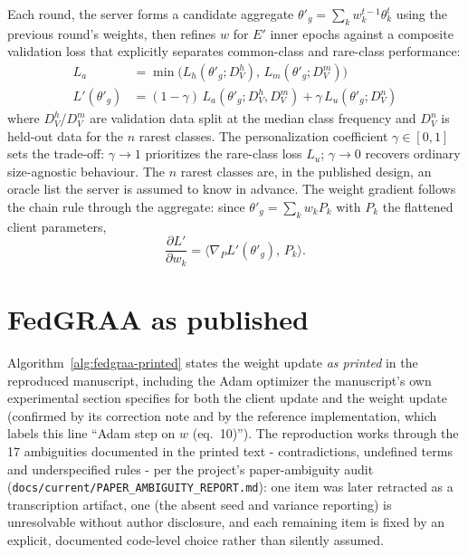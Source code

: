 \documentclass[11pt,a4paper]{report}
\newcommand{\Lprime}{L'}
\begin{document}
Each round, the server forms a candidate aggregate
$\theta'_g=\sum_k w_k^{t-1}\theta_k^t$ using the previous round's weights,
then refines $w$ for $E'$ inner epochs against a composite validation loss
that explicitly separates common-class and rare-class performance:
\begin{align}
L_a &= \min\bigl(L_h(\theta'_g; D_V^h),\, L_m(\theta'_g; D_V^m)\bigr)
\label{eq:la}\\
\Lprime(\theta'_g) &= (1-\gamma)\, L_a(\theta'_g; D_V^h, D_V^m)
                   + \gamma\, L_u(\theta'_g; D_V^n)
\label{eq:lprime}
\end{align}
where $D_V^h$/$D_V^m$ are validation data split at the median class frequency
and $D_V^n$ is held-out data for the $n$ rarest classes. The personalization
coefficient $\gamma\in[0,1]$ sets the trade-off: $\gamma\to1$ prioritizes the
rare-class loss $L_u$; $\gamma\to0$ recovers ordinary size-agnostic
behaviour. The $n$ rarest classes are, in the published design, an oracle
list the server is assumed to know in advance. The weight gradient follows
the chain rule through the aggregate: since
$\theta'_g=\sum_k w_k P_k$ with $P_k$ the flattened client parameters,
\begin{equation}
\frac{\partial \Lprime}{\partial w_k}
= \bigl\langle \nabla_P \Lprime(\theta'_g),\, P_k \bigr\rangle .
\label{eq:wgrad}
\end{equation}

\section{FedGRAA as published}
\label{sec:fedgraa-printed}

Algorithm~\ref{alg:fedgraa-printed} states the weight update \emph{as
printed} in the reproduced manuscript, including the Adam optimizer the
manuscript's own experimental section specifies for both the client update
and the weight update (confirmed by its correction note and by the reference
implementation, which labels this line ``Adam step on $w$ (eq.~10)''). The
reproduction works through the 17 ambiguities documented in the printed
text - contradictions, undefined terms and underspecified rules - per
the project's paper-ambiguity audit
(\texttt{docs/current/PAPER\_AMBIGUITY\_REPORT.md}): one item was later
retracted as a transcription artifact, one (the absent seed and
variance reporting) is unresolvable without author disclosure, and each
remaining item is fixed by an explicit, documented code-level choice
rather than silently assumed.
\end{document}
